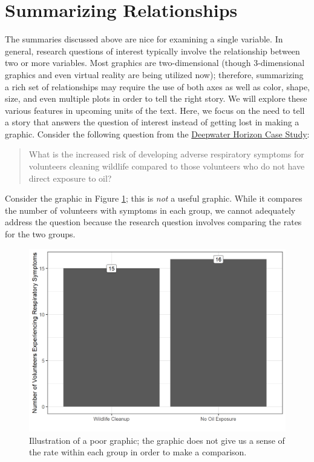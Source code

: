 \documentclass[
]{book}
\theoremstyle{plain}
\theoremstyle{mydefn}
\theoremstyle{myexmpl}
\theoremstyle{remark}
\begin{document}
\hypertarget{summarizing-relationships}{%
\section{Summarizing Relationships}\label{summarizing-relationships}}

The summaries discussed above are nice for examining a single variable. In general, research questions of interest typically involve the relationship between two or more variables. Most graphics are two-dimensional (though 3-dimensional graphics and even virtual reality are being utilized now); therefore, summarizing a rich set of relationships may require the use of both axes as well as color, shape, size, and even multiple plots in order to tell the right story. We will explore these various features in upcoming units of the text. Here, we focus on the need to tell a story that answers the question of interest instead of getting lost in making a graphic. Consider the following question from the \protect\hyperlink{CaseDeepwater}{Deepwater Horizon Case Study}:

\begin{quote}
What is the increased risk of developing adverse respiratory symptoms for volunteers cleaning wildlife compared to those volunteers who do not have direct exposure to oil?
\end{quote}

Consider the graphic in Figure \ref{fig:summaries-bad-barchart}; this is \emph{not} a useful graphic. While it compares the number of volunteers with symptoms in each group, we cannot adequately address the question because the research question involves comparing the rates for the two groups.

\begin{figure}

{\centering \includegraphics[width=0.8\linewidth]{./Images/summaries-bad-barchart-1} 

}

\caption{Illustration of a poor graphic; the graphic does not give us a sense of the rate within each group in order to make a comparison.}\label{fig:summaries-bad-barchart}
\end{figure}
\end{document}
